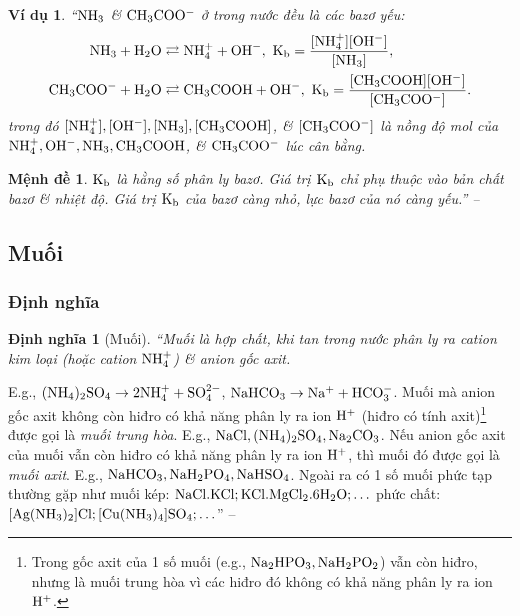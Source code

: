 \documentclass[oneside]{book}
\numberwithin{equation}{section}
\newtheorem{dinhnghia}{Định nghĩa}[section]
\newtheorem{vidu}{Ví dụ}[section]
\newtheorem{menhde}{Mệnh đề}[section]
\begin{document}
\begin{vidu}
	``$\rm NH_3$ \& $\rm CH_3COO^-$ ở trong nước đều là các bazơ yếu:
	\begin{align*}
		\rm NH_3 + H_2O&\rightleftarrows\rm NH_4^+ + OH^-,\ K_b = \frac{[NH_4^+][OH^-]}{[NH_3]},\\
		\rm CH_3COO^- + H_2O&\rightleftarrows\rm CH_3COOH + OH^-,\ K_b = \frac{[CH_3COOH][OH^-]}{[CH_3COO^-]}.
	\end{align*}
	trong đó $\rm[NH_4^+],[OH^-],[NH_3],[CH_3COOH]$, \& $\rm[CH_3COO^-]$ là nồng độ mol của $\rm NH_4^+,OH^-,NH_3,CH_3COOH$, \& $\rm CH_3COO^-$ lúc cân bằng.
\end{vidu}

\begin{menhde}
	$\rm K_b$ là \emph{hằng số phân ly bazơ}. Giá trị $\rm K_b$ chỉ phụ thuộc vào bản chất bazơ \& nhiệt độ. Giá trị $\rm K_b$ của bazơ càng nhỏ, lực bazơ của nó càng yếu.'' -- \cite[p. 14]{SGK_Hoa_Hoc_11_nang_cao}
\end{menhde}

\subsection{Muối}

\subsubsection{Định nghĩa}

\begin{dinhnghia}[Muối]
	``\emph{Muối} là hợp chất, khi tan trong nước phân ly ra cation kim loại (hoặc cation $\rm NH_4^+$) \& anion gốc axit.
\end{dinhnghia}
E.g., $\rm (NH_4)_2SO_4\to 2NH_4^+ + SO_4^{2-}$, $\rm NaHCO_3\to Na^+ + HCO_3^-$. Muối mà anion gốc axit không còn hiđro có khả năng phân ly ra ion $\rm H^+$ (hiđro có tính axit)\footnote{Trong gốc axit của 1 số muối (e.g., $\rm Na_2HPO_3, NaH_2PO_2$) vẫn còn hiđro, nhưng là muối trung hòa vì các hiđro đó không có khả năng phân ly ra ion $\rm H^+$.} được gọi là \textit{muối trung hòa}. E.g., $\rm NaCl,(NH_4)_2SO_4,Na_2CO_3$. Nếu anion gốc axit của muối vẫn còn hiđro có khả năng phân ly ra ion $\rm H^+$, thì muối đó được gọi là \textit{muối axit}. E.g., $\rm NaHCO_3,NaH_2PO_4,NaHSO_4$. Ngoài ra có 1 số muối phức tạp thường gặp như muối kép: $\rm NaCl.KCl;KCl.MgCl_2.6H_2O;\ldots$ phức chất: $\rm[Ag(NH_3)_2]Cl;[Cu(NH_3)_4]SO_4;\ldots$'' -- \cite[pp. 14--15]{SGK_Hoa_Hoc_11_nang_cao}
\end{document}
